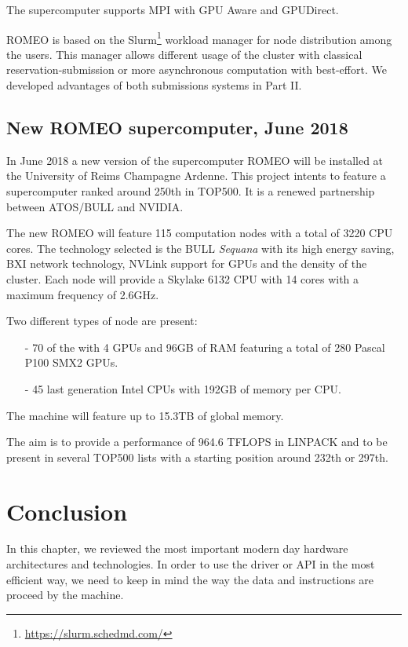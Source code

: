 The supercomputer supports MPI with GPU Aware and GPUDirect. 

ROMEO is based on the Slurm\footnote{\url{https://slurm.schedmd.com/}} workload manager for node distribution among the users. 
This manager allows different usage of the cluster with classical reservation-submission or more asynchronous computation with best-effort. 
We developed advantages of both submissions systems in Part II. 

\subsection{New ROMEO supercomputer, June 2018}

In June 2018 a new version of the supercomputer ROMEO will be installed at the University of Reims Champagne Ardenne. 
This project intents to feature a supercomputer ranked around 250th in TOP500. 
It is a renewed partnership between ATOS/BULL and NVIDIA. 

The new ROMEO will feature 115 computation nodes with a total of 3220 CPU cores. 
The technology selected is the BULL \textit{Sequana} with its high energy saving, BXI network technology, NVLink support for GPUs and the density of the cluster. 
Each node will provide a Skylake 6132 CPU with 14 cores with a maximum frequency of 2.6GHz.

Two different types of node are present: 
\begin{itemize}[noitemsep,nolistsep]
\item[-] 70 of the with 4 GPUs and 96GB of RAM featuring a total of 280 Pascal P100 SMX2 GPUs.
\item[-] 45 last generation Intel CPUs with 192GB of memory per CPU. 
\end{itemize}

The machine will feature up to 15.3TB of global memory. 

The aim is to provide a performance of 964.6 TFLOPS in LINPACK and to be present in several TOP500 lists with a starting position around 232th or 297th. 

\section{Conclusion}

In this chapter, we reviewed the most important modern day hardware architectures and technologies. 
In order to use the driver or API in the most efficient way, we need to keep in mind the way the data and instructions are proceed by the machine. 


